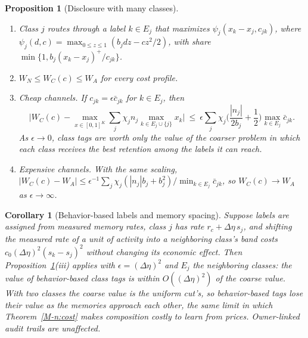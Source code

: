 \documentclass[12pt]{article}
\newtheorem{proposition}[theorem]{Proposition}
\newtheorem{corollary}[theorem]{Corollary}
\theoremstyle{definition}
\theoremstyle{remark}
\begin{document}
\begin{proposition}[Disclosure with many classes]\label{prop:relabelK}
\begin{enumerate}[label=(\roman*),itemsep=1pt]
\item Class $j$ routes through a label $k\in E_j$ that maximizes $\psi_j(x_k-x_j,c_{jk})$, where $\psi_j(d,c)=\max_{0\le z\le1}(b_jdz-cz^2/2)$, with share $\min\{1,b_j(x_k-x_j)^+/c_{jk}\}$.
\item $W_N\le W_C(c)\le W_A$ for every cost profile.
\item \emph{Cheap channels.} If $c_{jk}=\epsilon\bar c_{jk}$ for $k\in E_j$, then
\[
\Big|W_C(c)-\max_{x\in[0,1]^K}\sum_j\chi_jn_j\max_{k\in E_j\cup\{j\}}x_k\Big|\ \le\ \epsilon\sum_j\chi_j\Big(\frac{|n_j|}{2b_j}+\frac12\Big)\max_{k\in E_j}\bar c_{jk}.
\]
As $\epsilon\to0$, class tags are worth only the value of the coarser problem in which each class receives the best retention among the labels it can reach.
\item \emph{Expensive channels.} With the same scaling, $|W_C(c)-W_A|\le\epsilon^{-1}\sum_j\chi_j(|n_j|b_j+b_j^2)/\min_{k\in E_j}\bar c_{jk}$, so $W_C(c)\to W_A$ as $\epsilon\to\infty$.
\end{enumerate}
\end{proposition}

\begin{corollary}[Behavior-based labels and memory spacing]\label{cor:relabelspacing}
Suppose labels are assigned from measured memory rates, class $j$ has rate $r_c+\Delta\eta\,s_j$, and shifting the measured rate of a unit of activity into a neighboring class's band costs $c_0(\Delta\eta)^2(s_k-s_j)^2$ without changing its economic effect. Then Proposition~\ref{prop:relabelK}(iii) applies with $\epsilon=(\Delta\eta)^2$ and $E_j$ the neighboring classes: the value of behavior-based class tags is within $O((\Delta\eta)^2)$ of the coarse value. With two classes the coarse value is the uniform cut's, so behavior-based tags lose their value as the memories approach each other, the same limit in which Theorem~\ref{M-n:cost} makes composition costly to learn from prices. Owner-linked audit trails are unaffected.
\end{corollary}
\end{document}
